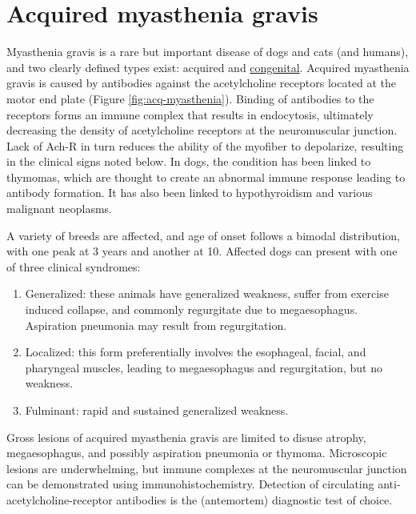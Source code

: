 \documentclass[openany]{report}
\providecommand{\tightlist}{%
  \setlength{\itemsep}{0pt}\setlength{\parskip}{0pt}}
\begin{document}
\hypertarget{acquired-myasthenia-gravis}{\section{Acquired myasthenia
gravis}\label{acquired-myasthenia-gravis}}

Myasthenia gravis is a rare but important disease of dogs and cats (and
humans), and two clearly defined types exist: acquired and
\protect\hyperlink{congenital-myasthenia-gravis}{congenital}. Acquired
myasthenia gravis is caused by antibodies against the acetylcholine
receptors located at the motor end plate (Figure
\ref{fig:acq-myasthenia}). Binding of antibodies to the receptors forms
an immune complex that results in endocytosis, ultimately decreasing the
density of acetylcholine receptors at the neuromuscular junction. Lack
of Ach-R in turn reduces the ability of the myofiber to depolarize,
resulting in the clinical signs noted below. In dogs, the condition has
been linked to thymomas, which are thought to create an abnormal immune
response leading to antibody formation. It has also been linked to
hypothyroidism and various malignant neoplasms.

A variety of breeds are affected, and age of onset follows a bimodal
distribution, with one peak at 3 years and another at 10. Affected dogs
can present with one of three clinical syndromes:

\begin{enumerate}
\def\labelenumi{\arabic{enumi}.}
\tightlist
\item
  Generalized: these animals have generalized weakness, suffer from
  exercise induced collapse, and commonly regurgitate due to
  megaesophagus. Aspiration pneumonia may result from regurgitation.
\item
  Localized: this form preferentially involves the esophageal, facial,
  and pharyngeal muscles, leading to megaesophagus and regurgitation,
  but no weakness.
\item
  Fulminant: rapid and sustained generalized weakness.
\end{enumerate}

Gross lesions of acquired myasthenia gravis are limited to disuse
atrophy, megaesophagus, and possibly aspiration pneumonia or thymoma.
Microscopic lesions are underwhelming, but immune complexes at the
neuromuscular junction can be demonstrated using immunohistochemistry.
Detection of circulating anti-acetylcholine-receptor antibodies is the
(antemortem) diagnostic test of choice.
\end{document}
